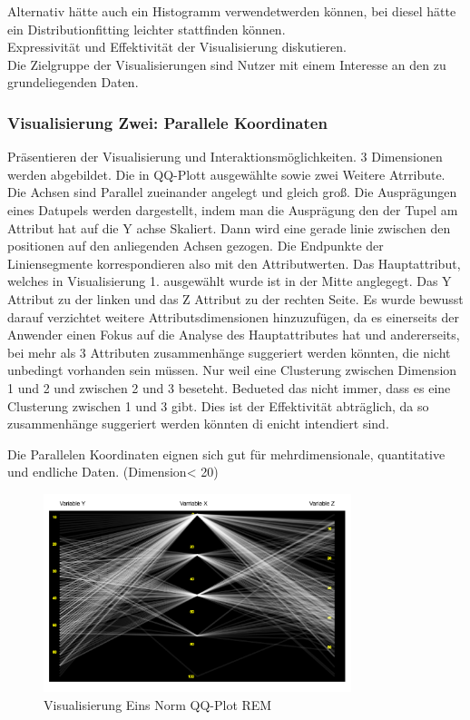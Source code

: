 \documentclass[usegeometry=true]{scrartcl}
\begin{document}
Alternativ hätte auch ein Histogramm verwendetwerden können, bei diesel hätte ein Distributionfitting leichter stattfinden können. 
\\

Expressivität und Effektivität der Visualisierung diskutieren.\\

Die Zielgruppe der Visualisierungen sind Nutzer mit einem Interesse an den zu grundeliegenden Daten. 







\subsubsection{Visualisierung Zwei: Parallele Koordinaten}
Präsentieren der Visualisierung und Interaktionsmöglichkeiten. 
3 Dimensionen werden abgebildet. Die in QQ-Plott ausgewählte sowie zwei Weitere Atrribute. Die Achsen sind Parallel zueinander angelegt und gleich groß. Die Ausprägungen eines Datupels werden dargestellt, indem man die Ausprägung den der Tupel am Attribut hat auf die Y achse Skaliert. Dann wird eine gerade linie zwischen den positionen auf den anliegenden Achsen gezogen. 
Die Endpunkte der Liniensegmente korrespondieren also mit den Attributwerten.
Das Hauptattribut, welches in Visualisierung 1. ausgewählt wurde ist in der Mitte anglegegt. Das Y Attribut zu der linken und das Z Attribut zu der rechten Seite.
Es wurde bewusst darauf verzichtet weitere Attributsdimensionen hinzuzufügen, da es einerseits der Anwender einen Fokus auf die Analyse des Hauptattributes hat und andererseits, bei mehr als 3 Attributen zusammenhänge suggeriert werden könnten, die nicht unbedingt vorhanden sein müssen. Nur weil eine Clusterung zwischen Dimension 1 und 2 und zwischen 2 und 3 beseteht. Bedueted das nicht immer, dass es eine Clusterung zwischen 1 und 3 gibt. 
 Dies ist der Effektivität abträglich, da so zusammenhänge suggeriert werden könnten di enicht intendiert sind.

Die Parallelen Koordinaten eignen sich gut für mehrdimensionale, quantitative und endliche Daten. 
(Dimension< 20)


\begin{figure}[h]
  \centering
  \includegraphics [width = 0.8\textwidth]{RoengtenBSP.JPG}
  \caption{Visualisierung Eins  Norm QQ-Plot REM }
\end{figure}
\end{document}
